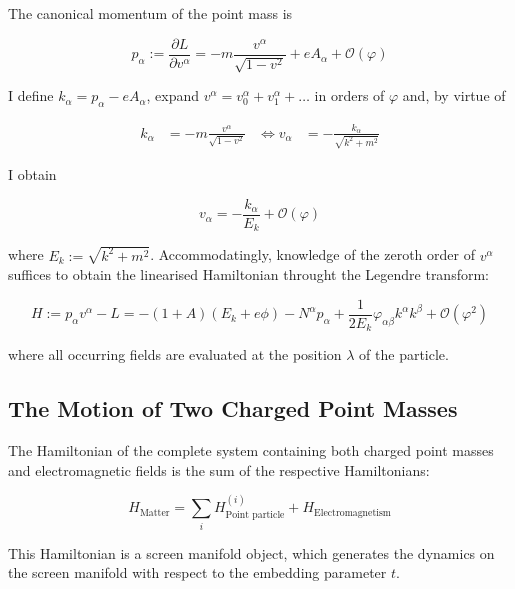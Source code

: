 \documentclass[11pt]{article}
\begin{document}
The canonical momentum of the point mass is

\begin{equation} \label{momentum_pp_met}
	p_\alpha := \frac{ \partial L}{\partial v^\alpha}
	= -m \frac{v^\alpha}{\sqrt{1- v^2}} + e A_\alpha	 
	+ \mathcal{O} \left(\varphi \right)
\end{equation}

I define $k_\alpha = p_\alpha - e A_\alpha$, expand $v^\alpha = v^\alpha_0 + v^\alpha_1 + \dots $ in orders of $\varphi$ and, by virtue of

\begin{align}
	k_\alpha &= -m \frac{v^\alpha}{\sqrt{1- v^2}} 
	 &\Leftrightarrow 
	 v_\alpha &= - \frac{k_\alpha}{\sqrt{k^2 + m^2}} 
\end{align}

I obtain

\begin{equation} \label{veloc_pp_met}
	v_\alpha = - \frac{k_\alpha}{E_k} + \mathcal{O} \left(\varphi \right)
\end{equation}

where $E_k := \sqrt{k^2+ m^2}$. Accommodatingly, knowledge of the zeroth order of $v^\alpha$ suffices to obtain the linearised Hamiltonian throught the Legendre transform:

\begin{equation} \label{ham_pp_met}
	H := p_\alpha v^\alpha - L  
	= - \left( 1 + A \right) \left( E_k + e \phi \right)
	- N^\alpha p_\alpha + \frac{1}{2 E_k} \varphi_{\alpha \beta} k^\alpha k^\beta + \mathcal{O} \left(\varphi^2 \right)
\end{equation}

where all occurring fields are evaluated at the position $\lambda$ of the particle.

\subsection{The Motion of Two Charged Point Masses} \label{sec_mot_bin}

The Hamiltonian of the complete system containing both charged point masses and electromagnetic fields is the sum of the respective Hamiltonians:

\begin{equation}
	H_{\text{Matter}}  = \sum_i H^{(i)}_{\text{Point particle}} + H_{\text{Electromagnetism}}
\end{equation}


This Hamiltonian is a screen manifold object, which generates the dynamics on the screen manifold with respect to the embedding parameter $t$.
\end{document}
